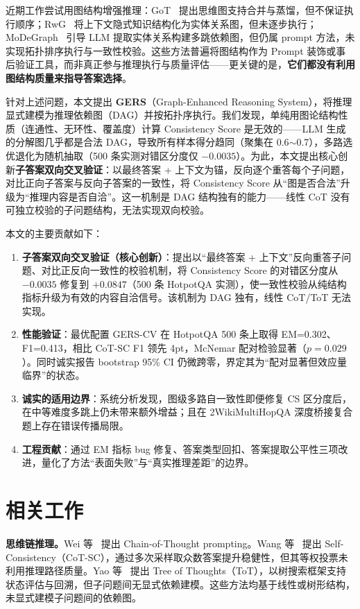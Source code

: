 \documentclass[11pt,a4paper]{ctexart}
\begin{document}
近期工作尝试用图结构增强推理：GoT~\cite{besta2024got} 提出思维图支持合并与蒸馏，但不保证执行顺序；RwG~\cite{han2025rwg} 将上下文隐式知识结构化为实体关系图，但未逐步执行；MoDeGraph~\cite{oruche2025modegraph} 引导 LLM 提取实体关系构建多跳依赖图，但仍属 prompt 方法，未实现拓扑排序执行与一致性校验。这些方法普遍将图结构作为 Prompt 装饰或事后验证工具，而非真正参与推理执行与质量评估——更关键的是，\textbf{它们都没有利用图结构质量来指导答案选择}。

针对上述问题，本文提出 \textbf{GERS}（Graph-Enhanced Reasoning System），将推理显式建模为推理依赖图（DAG）并按拓扑序执行。我们发现，单纯用图论结构性质（连通性、无环性、覆盖度）计算 Consistency Score 是无效的——LLM 生成的分解图几乎都是合法 DAG，导致所有样本得分趋同（聚集在 0.6$\sim$0.7），多路选优退化为随机抽取（500 条实测对错区分度仅 $-0.0035$）。为此，本文提出核心创新\textbf{子答案双向交叉验证}：以最终答案 + 上下文为锚，反向逐个重答每个子问题，对比正向子答案与反向子答案的一致性，将 Consistency Score 从``图是否合法''升级为``推理内容是否自洽''。这一机制是 DAG 结构独有的能力——线性 CoT 没有可独立校验的子问题结构，无法实现双向校验。

本文的主要贡献如下：
\begin{enumerate}[label=\arabic*.]
\item \textbf{子答案双向交叉验证（核心创新）}：提出以``最终答案 + 上下文''反向重答子问题、对比正反向一致性的校验机制，将 Consistency Score 的对错区分度从 $-0.0035$ 修复到 $+0.0847$（500 条 HotpotQA 实测），使一致性校验从纯结构指标升级为有效的内容自洽信号。该机制为 DAG 独有，线性 CoT/ToT 无法实现。
\item \textbf{性能验证}：最优配置 GERS-CV 在 HotpotQA 500 条上取得 EM=0.302、F1=0.413，相比 CoT-SC F1 领先 4pt，McNemar 配对检验显著（$p=0.029$）。同时诚实报告 bootstrap 95\% CI 仍微跨零，界定其为``配对显著但效应量临界''的状态。
\item \textbf{诚实的适用边界}：系统分析发现，图级多路自一致性即便修复 CS 区分度后，在中等难度多跳上仍未带来额外增益；且在 2WikiMultiHopQA 深度桥接复合题上存在错误传播局限。
\item \textbf{工程贡献}：通过 EM 指标 bug 修复、答案类型回扣、答案提取公平性三项改进，量化了方法``表面失败''与``真实推理差距''的边界。
\end{enumerate}

\section{相关工作}

\noindent\textbf{思维链推理。}Wei 等~\cite{wei2022cot} 提出 Chain-of-Thought prompting。Wang 等~\cite{wang2023sc} 提出 Self-Consistency（CoT-SC），通过多次采样取众数答案提升稳健性，但其等权投票未利用推理路径质量。Yao 等~\cite{yao2023tot} 提出 Tree of Thoughts（ToT），以树搜索框架支持状态评估与回溯，但子问题间无显式依赖建模。这些方法均基于线性或树形结构，未显式建模子问题间的依赖图。
\end{document}
